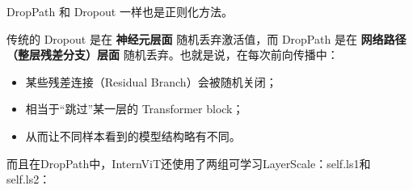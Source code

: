 \documentclass[zihao=false,fontset=windows]{ctexart}
\newcommand{\incode}[1]{\colorbox{inlinebg}{\ttfamily\small #1}}
\begin{document}

\par\vspace{0.95em}\par\vspace{0.28em}
DropPath 和 Dropout 一样也是正则化方法。\par
传统的 Dropout 是在 \textbf{神经元层面} 随机丢弃激活值，而 DropPath 是在 \textbf{\textcolor{feishuRed}{网络路径（整层残差分支）层面}} 随机丢弃。也就是说，在每次前向传播中：\par
\begin{itemize}
\item 某些残差连接（Residual Branch）会被随机关闭；
\end{itemize}
\begin{itemize}
\item 相当于\textcolor{feishuRed}{“跳过”}某一层的 Transformer block；
\end{itemize}
\begin{itemize}
\item 从而让不同样本看到的模型结构略有不同。
\end{itemize}
而且在DropPath中，InternViT还使用了两组可学习LayerScale：\incode{self.ls1}和 \incode{self.ls2}：\par
\end{document}
